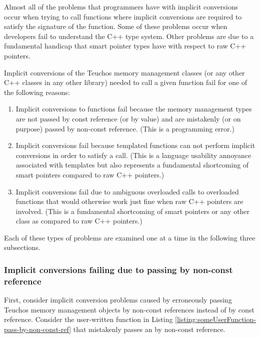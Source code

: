 \documentclass[pdf,ps2pdf,11pt]{SANDreport}
\begin{document}
Almost all of the problems that programmers have with implicit
conversions occur when trying to call functions where implicit
conversions are required to satisfy the signature of the function.
Some of these problems occur when developers fail to understand the
C++ type system.  Other problems are due to a fundamental handicap
that smart pointer types have with respect to raw C++ pointers.

Implicit conversions of the Teuchos memory management classes (or any
other C++ classes in any other library) needed to call a given
function fail for one of the following reasons:

\begin{enumerate}

{}\item{}Implicit conversions to functions fail because the memory
management types are not passed by const reference (or by value) and
are mistakenly (or on purpose) passed by non-const reference. (This is
a programming error.)

{}\item{}Implicit conversions fail because templated functions can not
perform implicit conversions in order to satisfy a call. (This is a
language usability annoyance associated with templates but also
represents a fundamental shortcoming of smart pointers compared to raw
C++ pointers.)

{}\item{}Implicit conversions fail due to ambiguous overloaded calls
to overloaded functions that would otherwise work just fine when raw
C++ pointers are involved. (This is a fundamental shortcoming of smart
pointers or any other class as compared to raw C++ pointers.)

\end{enumerate}

Each of these types of problems are examined one at a time in the
following three subsections.


%
{}\subsubsection*{Implicit conversions failing due to passing by
non-const reference}
%


First, consider implicit conversion problems caused by erroneously
passing Teuchos memory management objects by non-const references
instead of by const reference.  Consider the user-written function in
Listing {}\ref{listing:someUserFunction-pass-by-non-const-ref} that
mistakenly passes an {} by non-const reference.
\end{document}
